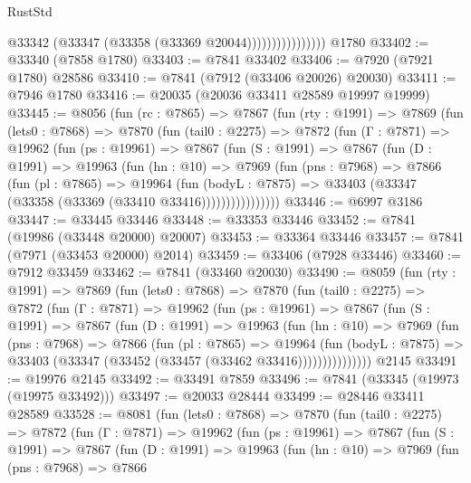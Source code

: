 \begin{lexlean}{RustStd}
\begin{coremodule}
{\begin{coremodule}
{{{{{{{{{{{{{{{{{{{{{{{{{{{{{{{{{{{{{{{{{{{{{{{{{{{{{{                            @33342 (@33347 (@33358 (@33369 @20044))))))))))))))))
    @1780
@33402 := @33340 (@7858 @1780)
@33403 := @7841 @33402
@33406 := @7920 (@7921 @1780) @28586
@33410 := @7841 (@7912 (@33406 @20026) @20030)
@33411 := @7946 @1780
@33416 := @20035 (@20036 @33411 @28589 @19997 @19999)
@33445 := @8056
    (fun (rc : @7865) =>
    @7867
      (fun (rty : @1991) =>
      @7869
        (fun (lets0 : @7868) =>
        @7870
          (fun (tail0 : @2275) =>
          @7872
            (fun (Γ : @7871) =>
            @19962
              (fun (ps : @19961) =>
              @7867
                (fun (S : @1991) =>
                @7867
                  (fun (D : @1991) =>
                  @19963
                    (fun (hn : @10) =>
                    @7969
                      (fun (pns : @7968) =>
                      @7866
                        (fun (pl : @7865) =>
                        @19964
                          (fun (bodyL : @7875) =>
                          @33403 (@33347 (@33358 (@33369 (@33410 @33416))))))))))))))))
@33446 := @6997 @3186
@33447 := @33445 @33446
@33448 := @33353 @33446
@33452 := @7841 (@19986 (@33448 @20000) @20007)
@33453 := @33364 @33446
@33457 := @7841 (@7971 (@33453 @20000) @2014)
@33459 := @33406 (@7928 @33446)
@33460 := @7912 @33459
@33462 := @7841 (@33460 @20030)
@33490 := @8059
    (fun (rty : @1991) =>
    @7869
      (fun (lets0 : @7868) =>
      @7870
        (fun (tail0 : @2275) =>
        @7872
          (fun (Γ : @7871) =>
          @19962
            (fun (ps : @19961) =>
            @7867
              (fun (S : @1991) =>
              @7867
                (fun (D : @1991) =>
                @19963
                  (fun (hn : @10) =>
                  @7969
                    (fun (pns : @7968) =>
                    @7866
                      (fun (pl : @7865) =>
                      @19964
                        (fun (bodyL : @7875) =>
                        @33403 (@33347 (@33452 (@33457 (@33462 @33416)))))))))))))))
    @2145
@33491 := @19976 @2145
@33492 := @33491 @7859
@33496 := @7841 (@33345 (@19973 (@19975 @33492)))
@33497 := @20033 @28444
@33499 := @28446 @33411 @28589
@33528 := @8081
    (fun (lets0 : @7868) =>
    @7870
      (fun (tail0 : @2275) =>
      @7872
        (fun (Γ : @7871) =>
        @19962
          (fun (ps : @19961) =>
          @7867
            (fun (S : @1991) =>
            @7867
              (fun (D : @1991) =>
              @19963
                (fun (hn : @10) =>
                @7969
                  (fun (pns : @7968) =>
                  @7866
}}}}}}}}}}}}}}}}}}}}}}}}}}}}}}}}}}}}}}}}}}}}}}}}}}}}}}
\end{coremodule}}
\end{coremodule}
\end{lexlean}
